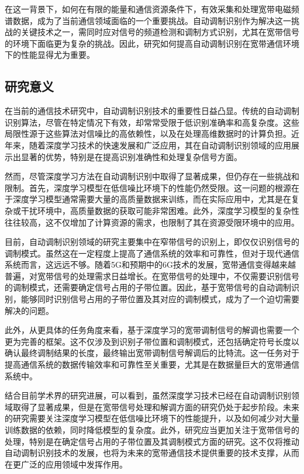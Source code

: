 在这一背景下，如何在有限的能量和通信资源条件下，有效采集和处理宽带电磁频谱数据，成为了当前通信领域面临的一个重要挑战。自动调制识别作为解决这一挑战的关键技术之一，需同时应对信号的频道检测和调制方式识别，尤其在宽带信号的环境下面临更为复杂的挑战。因此，研究如何提高自动调制识别在宽带通信环境下的性能显得尤为重要。

\subsection{研究意义}\label{sec:background}

在当前的通信技术研究中，自动调制识别技术的重要性日益凸显。传统的自动调制识别算法，尽管在特定情况下有效，却常常受限于低识别准确率和高复杂度。这些局限性源于这些算法对信噪比的高依赖性，以及在处理高维数据时的计算负担。近年来，随着深度学习技术的快速发展和广泛应用，其在自动调制识别领域的应用展示出显著的优势，特别是在提高识别准确性和处理复杂信号方面。

然而，尽管深度学习方法在自动调制识别中取得了显著成果，但仍存在一些挑战和限制。首先，深度学习模型在低信噪比环境下的性能仍然受限。这一问题的根源在于深度学习模型通常需要大量的高质量数据来训练，而在实际应用中，尤其是在复杂或干扰环境中，高质量数据的获取可能非常困难。此外，深度学习模型的复杂性往往较高，这不仅增加了计算资源的需求，也限制了其在资源受限环境中的应用。

目前，自动调制识别领域的研究主要集中在窄带信号的识别上，即仅仅识别信号的调制模式。虽然这在一定程度上提高了通信系统的效率和可靠性，但对于现代通信系统而言，这远远不够。随着5G和预期中的6G技术的发展，宽带通信变得越来越普遍，对宽带信号的处理需求日益增长。在宽带信号的处理中，不仅需要识别信号的调制模式，还需要确定信号占用的子带位置。因此，基于宽带信号的自动调制识别，能够同时识别信号占用的子带位置及其对应的调制模式，成为了一个迫切需要解决的问题。

此外，从更具体的任务角度来看，基于深度学习的宽带调制信号的解调也需要一个更为完善的框架。这不仅涉及到识别子带位置和调制模式，还包括确定符号长度以确认最终调制结果的长度，最终输出宽带调制信号解调后的比特流。这一任务对于提高通信系统的数据传输效率和可靠性至关重要，尤其是在数据量巨大的宽带通信系统中。

结合目前学术界的研究进展，可以看到，虽然深度学习技术已经在自动调制识别领域取得了显著成果，但是在宽带信号处理和解调方面的研究仍处于起步阶段。未来的研究需要关注深度学习模型在低信噪比环境下的性能提升，以及如何减少对大量训练数据的依赖，同时降低模型的复杂度。此外，研究应当更加关注于宽带信号的处理，特别是在确定信号占用的子带位置及其调制模式方面的研究。这不仅将推动自动调制识别技术的发展，也将为未来的宽带通信技术提供重要的技术支撑，从而在更广泛的应用领域中发挥作用。

